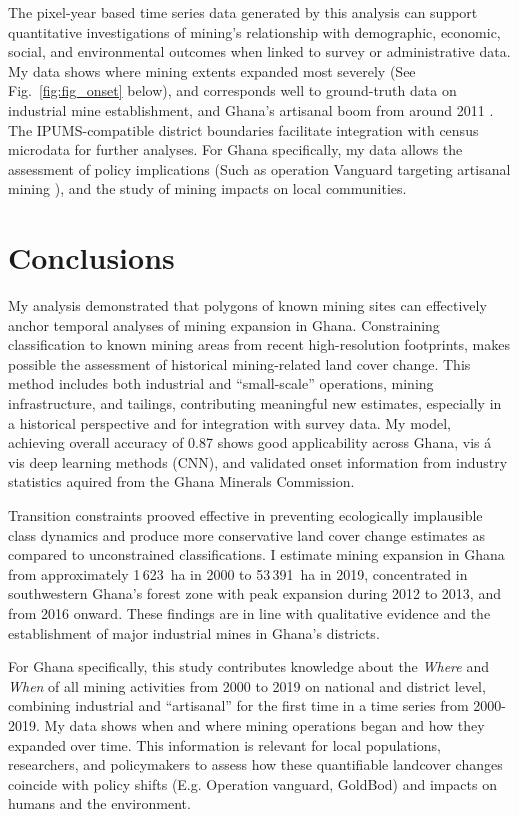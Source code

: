 \documentclass[]{interact}
\begin{document}
The pixel-year based time series data generated by this analysis can support quantitative investigations of mining's relationship with demographic, economic, social, and environmental outcomes when linked to survey or administrative data. My data shows where mining extents expanded most severely (See Fig.~\ref{fig:fig_onset} below), and corresponds well to ground-truth data on industrial mine establishment, and Ghana's artisanal boom from around 2011 \citep{Industrystatistics}. The IPUMS-compatible district boundaries \citep{ruggles2025Integrated} facilitate integration with census microdata for further analyses. For Ghana specifically, my data allows the assessment of policy implications (Such as operation Vanguard targeting artisanal mining \citep{hilson2017Shootings}), and the study of mining impacts on local communities. 

\section{Conclusions}
My analysis demonstrated that polygons of known mining sites can effectively anchor temporal analyses of mining expansion in Ghana. Constraining classification to known mining areas from recent high-resolution footprints, makes possible the assessment of historical mining-related land cover change. This method includes both industrial and ``small-scale'' operations, mining infrastructure, and tailings, contributing meaningful new estimates, especially in a historical perspective and for integration with survey data. My model, achieving overall accuracy of 0.87 shows good applicability across Ghana, vis á vis deep learning methods (CNN), and validated onset information from industry statistics aquired from the Ghana Minerals Commission.

Transition constraints prooved effective in preventing ecologically implausible class dynamics and produce more conservative land cover change estimates as compared to unconstrained classifications. I estimate mining expansion in Ghana from approximately 1\,623~ha in 2000 to 53\,391~ha in 2019, concentrated in southwestern Ghana's forest zone with peak expansion during 2012 to 2013, and from 2016 onward. These findings are in line with qualitative evidence and the establishment of major industrial mines in Ghana's districts.

For Ghana specifically, this study contributes knowledge about the \textit{Where} and \textit{When} of all mining activities from 2000 to 2019 on national and district level, combining industrial and ``artisanal'' for the first time in a time series from 2000-2019. My data shows when and where mining operations began and how they expanded over time. This information is relevant for local populations, researchers, and policymakers to assess how these quantifiable landcover changes coincide with policy shifts (E.g. Operation vanguard, GoldBod) and impacts on humans and the environment.
\end{document}
